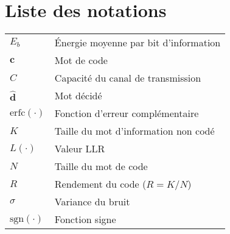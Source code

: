 \chapter*{Liste des notations}
\begin{center}

\begin{longtable}{ p{}  p{} } 

$E_b$         	 		&	Énergie moyenne par bit d'information     												\\
$\mathbf{c}$			& 	Mot de code 																			\\
$C$						& 	Capacité du canal de transmission														\\
$\mathbf{\hat{d}}$		&	Mot décidé																				\\
$\text{erfc}(\cdot)$    &	Fonction d'erreur complémentaire     													\\
$K$     	  			&	Taille du mot d'information non codé     												\\
$L(\cdot)$				&	Valeur LLR 																				\\
$N$     	 			& 	Taille du mot de code                													\\
$R$     	 			&	Rendement du code ($R=K/N$)       														\\
$\sigma$				&   Variance du bruit																		\\
$\text{sgn}(\cdot)$    	&	Fonction signe																			\\


		
\end{longtable}

\end{center}
